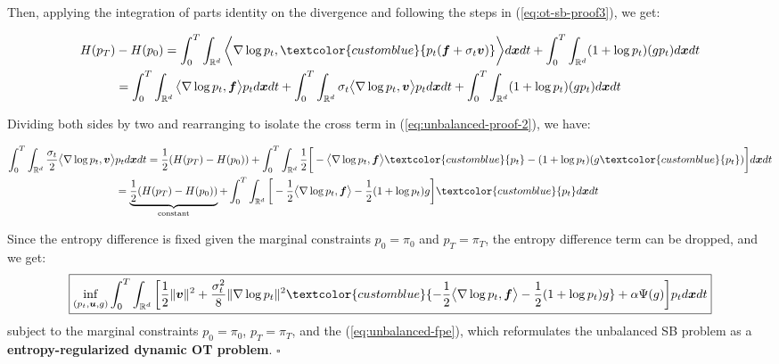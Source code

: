\documentclass{article}
\newcommand{\bluetext}[1]{\textcolor{customblue}{#1}}
\begin{document}
Then, applying the integration of parts identity on the divergence and following the steps in (\ref{eq:ot-sb-proof3}), we get:
\begin{small}
\begin{align}
    H(p_T)&-H(p_0)=\int_0^T\int_{\mathbb{R}^d}\bigg\langle\nabla\log p_t,\bluetext{p_t(\boldsymbol{f}+\sigma_t\boldsymbol{v})}\bigg\rangle d\boldsymbol{x}dt+\int_0^T\int_{\mathbb{R}^d}(1+\log p_t)(gp_t)d\boldsymbol{x}dt\nonumber\\
    &=\int_0^T\int_{\mathbb{R}^d}\big\langle\nabla\log p_t,\boldsymbol{f}\big\rangle p_td\boldsymbol{x}dt+\int_0^T\int_{\mathbb{R}^d}\sigma_t\big\langle\nabla\log p_t,\boldsymbol{v}\big\rangle p_td\boldsymbol{x}dt+\int_0^T\int_{\mathbb{R}^d}(1+\log p_t)(gp_t)d\boldsymbol{x}dt
\end{align}
\end{small}
Dividing both sides by two and rearranging to isolate the cross term in (\ref{eq:unbalanced-proof-2}), we have:
\begin{small}
\begin{align}
     \int_0^T\int_{\mathbb{R}^d}\frac{\sigma_t}{2}\big\langle\nabla\log p_t,\boldsymbol{v}\big\rangle &p_td\boldsymbol{x}dt=\frac{1}{2}(H(p_T)-H(p_0)) +\int_0^T\int_{\mathbb{R}^d}\frac{1}{2}\bigg[-\big\langle\nabla\log p_t,\boldsymbol{f}\big\rangle \bluetext{p_t} -(1+\log p_t)(g\bluetext{p_t})\bigg]d\boldsymbol{x}dt\nonumber\\
     &=\underbrace{\frac{1}{2}(H(p_T)-H(p_0))}_{\text{constant}} +\int_0^T\int_{\mathbb{R}^d}\bigg[-\frac{1}{2}\big\langle\nabla\log p_t,\boldsymbol{f}\big\rangle -\frac{1}{2}(1+\log p_t)g\bigg]\bluetext{p_t}d\boldsymbol{x}dt
\end{align}
\end{small}
Since the entropy difference is fixed given the marginal constraints $p_0=\pi_0$ and $p_T=\pi_T$, the entropy difference term can be dropped, and we get: 
\begin{align}
    \boxed{\inf_{(p_t, \boldsymbol{u}, g)}\int_0^T\int_{\mathbb{R}^d}\bigg[\frac{1}{2}\|\boldsymbol{v}\|^2+\frac{\sigma_t^2}{8}\|\nabla \log  p_t\|^2\bluetext{-\frac{1}{2}\big\langle\nabla\log p_t,\boldsymbol{f}\big\rangle -\frac{1}{2}(1+\log p_t)g}+\alpha\Psi(g)\bigg]p_td\boldsymbol{x}dt}
\end{align}
subject to the marginal constraints $p_0=\pi_0$, $p_T=\pi_T$, and the (\ref{eq:unbalanced-fpe}), which reformulates the unbalanced SB problem as a \textbf{entropy-regularized dynamic OT problem}. \hfill $\square$
\end{document}
